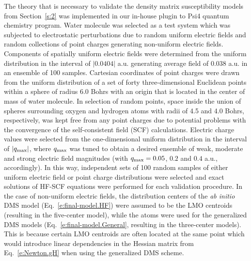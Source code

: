 \documentclass[aip,jcp,preprint,amsmath,amssymb,floatfix]{revtex4-1}
\begin{document}
The theory that is necessary to validate the density matrix susceptibility models from Section~\ref{s:2}
was implemented in our in\hyp{}house plugin to {\sc Psi4} quantum chemistry program.\cite{Psi4.JCTC.2017}
Water molecule was selected as a test system which was subjected to 
electrostatic perturbations due to random uniform electric fields and random collections of point charges
generating non\hyp{}uniform electric fields.
Components of spatially uniform electric fields were determined 
from the uniform distribution in the interval 
of $\vert 0.0404 \vert$ a.u. generating average field of 0.038 a.u. in an ensemble of 100 samples.
Cartesian coordinates of point charges were drawn from the uniform distribution 
of a set of forty three\hyp{}dimensional Euclidean points within a sphere of radius 6.0 Bohrs
with an origin that is located in the center of mass of water molecule.
In selection of random points, space inside the union of spheres surrounding
oxygen and hydrogen atoms with radii of 4.5 and 4.0 Bohrs, respectively, was
kept free from any point charges due to potential problems with the convergence of the 
self\hyp{}consistent field (SCF) calculations.
Electric charge values were selected from the one\hyp{}dimensional uniform distribution
in the interval of $\vert q_{\rm max} \vert$, where $q_{\rm max}$
was tuned to obtain a desired ensemble of weak, moderate and strong electric field magnitudes
(with $q_{\rm max}=0.05$, $0.2$ and $0.4$ a.u., accordingly).
In this way, independent sets of 100 random samples of either uniform electric field or
point charge distributions were selected and exact solutions of HF\hyp{}SCF equations were 
performed for each validation procedure.
In the case of non\hyp{}uniform electric fields, the distribution centers 
of the \emph{ab initio} DMS model (Eq.~\eqref{e:final-model.HF}) were assumed 
to be the LMO centroids (resulting in the five\hyp{}center model), 
while the atoms were used for the generalized DMS models (Eq.~\eqref{e:final-model.General}, 
resulting in the three\hyp{}center models).
This is because certain LMO centroids are often located at the same point which would
introduce linear dependencies in the Hessian matrix from Eq.~\eqref{e:Newton.gH}
when using the generalized DMS scheme.
\end{document}
